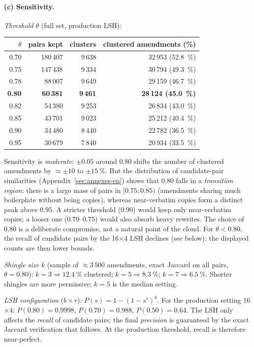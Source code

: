 \paragraph{(c) Sensitivity.}
\emph{Threshold $\theta$} (full set, production LSH):
\begin{center}\small
\begin{tabular}{rrrr}
\toprule
$\theta$ & pairs kept & clusters & clustered amendments (\%) \\
\midrule
0.70 & 180\,407 & 9\,638 & 32\,953 \;(52.8~\%) \\
0.75 & 147\,438 & 9\,334 & 30\,794 \;(49.3~\%) \\
0.78 & \phantom{0}88\,007 & 9\,649 & 29\,159 \;(46.7~\%) \\
\textbf{0.80} & \phantom{0}\textbf{60\,381} & \textbf{9\,461} & \textbf{28\,124 \;(45.0~\%)} \\
0.82 & \phantom{0}54\,380 & 9\,253 & 26\,834 \;(43.0~\%) \\
0.85 & \phantom{0}43\,701 & 9\,023 & 25\,212 \;(40.4~\%) \\
0.90 & \phantom{0}34\,480 & 8\,440 & 22\,782 \;(36.5~\%) \\
0.95 & \phantom{0}30\,679 & 7\,840 & 20\,934 \;(33.5~\%) \\
\bottomrule
\end{tabular}
\end{center}
Sensitivity is \emph{moderate}: $\pm0.05$ around $0.80$ shifts the number of
clustered amendments by $\approx\pm10$ to $\pm15~\%$. But the distribution of
candidate-pair similarities (Appendix~\ref{sec:annexes-en}) shows that $0.80$
falls in a \emph{transition region}: there is a large mass of pairs in
$[0.75;0.85)$ (amendments sharing much boilerplate without being copies), whereas
near-verbatim copies form a distinct peak above $0.95$. A stricter threshold
($0.90$) would keep only near-verbatim copies; a looser one ($0.70$--$0.75$) would
also absorb heavy rewrites. The choice of $0.80$ is a deliberate compromise, not a
\og{}natural\fg{} point of the cloud. For $\theta<0.80$, the recall of candidate
pairs by the 16$\times$4 LSH declines (see below): the displayed counts are then
lower bounds.

\emph{Shingle size $k$} (sample of $\approx 3\,500$ amendments, exact Jaccard on
all pairs, $\theta=0.80$): $k=3 \Rightarrow 12.4~\%$ clustered; $k=5 \Rightarrow
8.3~\%$; $k=7 \Rightarrow 6.5~\%$. Shorter shingles are more permissive; $k=5$ is
the median setting.

\emph{LSH configuration} ($b\times r$): $P(s)=1-(1-s^r)^b$. For the production
setting 16$\times$4: $P(0.80)=0.9998$, $P(0.70)=0.988$, $P(0.50)=0.64$. The LSH
only affects the \emph{recall} of candidate pairs; the final \emph{precision} is
guaranteed by the exact Jaccard verification that follows. At the production
threshold, recall is therefore near-perfect.

